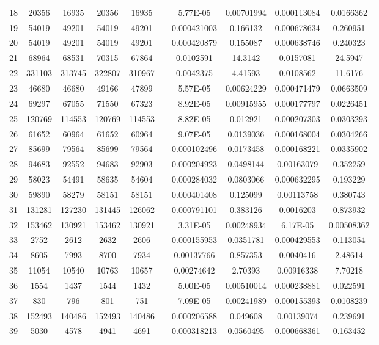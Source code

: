 \documentclass{article}
\begin{document}
\begin{table}[h!]
\begin{tabular}{c||c|c|c|c c c|c|c|c}
18 & 20356 & 16935 & 20356 & 16935 &  & 5.77E-05 & 0.00701994 & 0.000113084 & 0.0166362 \\
19 & 54019 & 49201 & 54019 & 49201 &  & 0.000421003 & 0.166132 & 0.000678634 & 0.260951 \\
20 & 54019 & 49201 & 54019 & 49201 &  & 0.000420879 & 0.155087 & 0.000638746 & 0.240323 \\
21 & 68964 & 68531 & 70315 & 67864 &  & 0.0102591 & 14.3142 & 0.0157081 & 24.5947 \\
22 & 331103 & 313745 & 322807 & 310967 &  & 0.0042375 & 4.41593 & 0.0108562 & 11.6176 \\
23 & 46680 & 46680 & 49166 & 47899 &  & 5.57E-05 & 0.00624229 & 0.000471479 & 0.0663509 \\
24 & 69297 & 67055 & 71550 & 67323 &  & 8.92E-05 & 0.00915955 & 0.000177797 & 0.0226451 \\
25 & 120769 & 114553 & 120769 & 114553 &  & 8.82E-05 & 0.012921 & 0.000207303 & 0.0303293 \\
26 & 61652 & 60964 & 61652 & 60964 &  & 9.07E-05 & 0.0139036 & 0.000168004 & 0.0304266 \\
27 & 85699 & 79564 & 85699 & 79564 &  & 0.000102496 & 0.0173458 & 0.000168221 & 0.0335902 \\
28 & 94683 & 92552 & 94683 & 92903 &  & 0.000204923 & 0.0498144 & 0.00163079 & 0.352259 \\
29 & 58023 & 54491 & 58635 & 54604 &  & 0.000284032 & 0.0803066 & 0.000632295 & 0.193229 \\
30 & 59890 & 58279 & 58151 & 58151 &  & 0.000401408 & 0.125099 & 0.00113758 & 0.380743 \\
31 & 131281 & 127230 & 131445 & 126062 &  & 0.000791101 & 0.383126 & 0.0016203 & 0.873932 \\
32 & 153462 & 130921 & 153462 & 130921 &  & 3.31E-05 & 0.00248934 & 6.17E-05 & 0.00508362 \\
33 & 2752 & 2612 & 2632 & 2606 &  & 0.000155953 & 0.0351781 & 0.000429553 & 0.113054 \\
34 & 8605 & 7993 & 8700 & 7934 &  & 0.00137766 & 0.857353 & 0.0040416 & 2.48614 \\
35 & 11054 & 10540 & 10763 & 10657 &  & 0.00274642 & 2.70393 & 0.00916338 & 7.70218 \\
36 & 1554 & 1437 & 1544 & 1432 &  & 5.00E-05 & 0.00510014 & 0.000238881 & 0.022591 \\
37 & 830 & 796 & 801 & 751 &  & 7.09E-05 & 0.00241989 & 0.000155393 & 0.0108239 \\
38 & 152493 & 140486 & 152493 & 140486 &  & 0.000206588 & 0.049608 & 0.00139074 & 0.239691 \\
39 & 5030 & 4578 & 4941 & 4691 &  & 0.000318213 & 0.0560495 & 0.000668361 & 0.163452 \\
\end{tabular}
\end{table}
\end{document}
